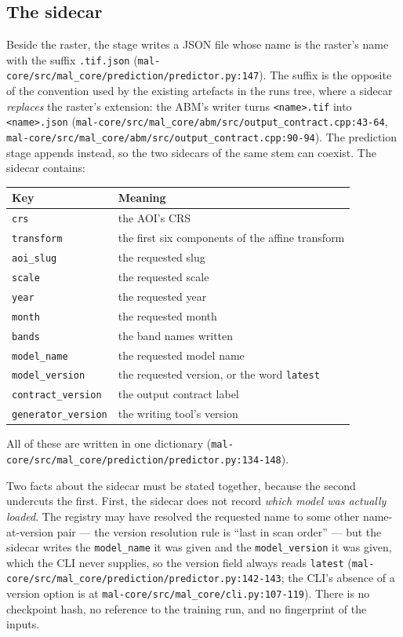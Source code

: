 \documentclass[11pt,a4paper]{article}
\newcommand{\code}[1]{\texttt{#1}}
\begin{document}
\subsection{The sidecar}

Beside the raster, the stage writes a JSON file whose name is the raster's
name with the suffix \code{.tif.json}
(\code{mal-core/src/mal\_core/prediction/predictor.py:147}). The suffix is
the opposite of the convention used by the existing artefacts in the runs
tree, where a sidecar \emph{replaces} the raster's extension: the ABM's writer
turns \code{<name>.tif} into \code{<name>.json}
(\code{mal-core/src/mal\_core/abm/src/output\_contract.cpp:43-64},
\code{mal-core/src/mal\_core/abm/src/output\_contract.cpp:90-94}). The
prediction stage appends instead, so the two sidecars of the same stem can
coexist. The sidecar contains:

\begin{center}
\begin{tabular}{@{}ll@{}}
\toprule
Key & Meaning \\
\midrule
\code{crs} & the AOI's CRS \\
\code{transform} & the first six components of the affine transform \\
\code{aoi\_slug} & the requested slug \\
\code{scale} & the requested scale \\
\code{year} & the requested year \\
\code{month} & the requested month \\
\code{bands} & the band names written \\
\code{model\_name} & the requested model name \\
\code{model\_version} & the requested version, or the word \code{latest} \\
\code{contract\_version} & the output contract label \\
\code{generator\_version} & the writing tool's version \\
\bottomrule
\end{tabular}
\end{center}

All of these are written in one dictionary
(\code{mal-core/src/mal\_core/prediction/predictor.py:134-148}).

Two facts about the sidecar must be stated together, because the second
undercuts the first. First, the sidecar does not record \emph{which model was
actually loaded}. The registry may have resolved the requested name to some
other name-at-version pair --- the version resolution rule is ``last in scan
order'' --- but the sidecar writes the \code{model\_name} it was given and
the \code{model\_version} it was given, which the CLI never supplies, so the
version field always reads \code{latest}
(\code{mal-core/src/mal\_core/prediction/predictor.py:142-143};
the CLI's absence of a version option is at
\code{mal-core/src/mal\_core/cli.py:107-119}). There is no checkpoint hash,
no reference to the training run, and no fingerprint of the inputs.
\end{document}
